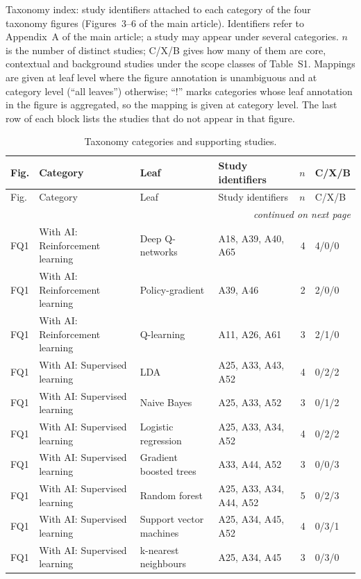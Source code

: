 Taxonomy index: study identifiers attached to each category of the four taxonomy figures (Figures~3--6 of the main article). Identifiers refer to Appendix~A of the main article; a study may appear under several categories. $n$ is the number of distinct studies; C/X/B gives how many of them are core, contextual and background studies under the scope classes of Table~S1. Mappings are given at leaf level where the figure annotation is unambiguous and at category level (``all leaves'') otherwise; ``!'' marks categories whose leaf annotation in the figure is aggregated, so the mapping is given at category level. The last row of each block lists the studies that do not appear in that figure.

{
\begin{footnotesize}
\setlength{\tabcolsep}{3pt}
\begin{longtable}{p{0.63cm}p{2.83cm}p{2.67cm}p{5.19cm}rp{1.26cm}}
\caption{Taxonomy categories and supporting studies.}\label{tab:taxonomy_index}\\
\hline Fig. & Category & Leaf & Study identifiers & $n$ & C/X/B \\ \hline
\endfirsthead
\hline Fig. & Category & Leaf & Study identifiers & $n$ & C/X/B \\ \hline
\endhead
\hline \multicolumn{6}{r}{\emph{continued on next page}}\\
\endfoot
\hline
\endlastfoot
FQ1 & With AI: Reinforcement learning & Deep Q-networks & A18, A39, A40, A65 & 4 & 4/0/0 \\
FQ1 & With AI: Reinforcement learning & Policy-gradient & A39, A46 & 2 & 2/0/0 \\
FQ1 & With AI: Reinforcement learning & Q-learning & A11, A26, A61 & 3 & 2/1/0 \\
FQ1 & With AI: Supervised learning & LDA & A25, A33, A43, A52 & 4 & 0/2/2 \\
FQ1 & With AI: Supervised learning & Naive Bayes & A25, A33, A52 & 3 & 0/1/2 \\
FQ1 & With AI: Supervised learning & Logistic regression & A25, A33, A34, A52 & 4 & 0/2/2 \\
FQ1 & With AI: Supervised learning & Gradient boosted trees & A33, A44, A52 & 3 & 0/0/3 \\
FQ1 & With AI: Supervised learning & Random forest & A25, A33, A34, A44, A52 & 5 & 0/2/3 \\
FQ1 & With AI: Supervised learning & Support vector machines & A25, A34, A45, A52 & 4 & 0/3/1 \\
FQ1 & With AI: Supervised learning & k-nearest neighbours & A25, A34, A45 & 3 & 0/3/0 \\

\end{longtable}
\end{footnotesize}}
